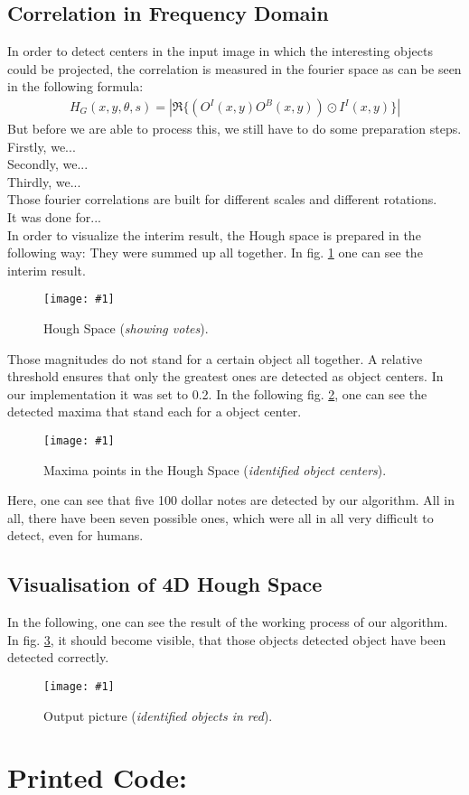 \documentclass[a4paper,headings=small]{scrartcl}
\numberwithin{equation}{section} %
\numberwithin{figure}{section}   %
\newcommand{\image}[3]{
	\begin{figure}[htbp]
		\centering
		\texttt{[image: \#1]}
		\caption{#3}
		\label{fig:#1}
	\end{figure}
}
\newcommand{\generatedImgRoot}{../../../target}
\newcommand{\targetFlag}{test_} %
\newcommand{\objThresh}{0.2} %
\begin{document}
\subsection{Correlation in Frequency Domain}
In order to detect centers in the input image in which the interesting objects could be projected,
the correlation is measured in the fourier space as can be seen in the following formula:
\begin{align}
H_G(x,y,\theta,s) = |\Re\{(O^I(x,y)O^B(x,y))\odot I^I(x,y)\}|
\end{align}
But before we are able to process this, we still have to do some preparation steps.\\
Firstly, we...\\
Secondly, we...\\
Thirdly, we...\\
Those fourier correlations are built for different scales and different rotations.\\
It was done for...\\
In order to visualize the interim result, the Hough space is prepared in the following way:
They were summed up all together.
In fig. \ref{fig:\generatedImgRoot/\targetFlag8_Hough.png} one can see the interim result.

\image{\generatedImgRoot/\targetFlag8_Hough.png}{0.4}{%
		Hough Space (\emph{showing votes}).}

Those magnitudes do not stand for a certain object all together. 
A relative threshold ensures that only the greatest ones are detected as object centers.
In our implementation it was set to \objThresh.
In the following fig. \ref{fig:\generatedImgRoot/\targetFlag9_maxHough.png},
one can see the detected maxima that stand each for a object center.

\image{\generatedImgRoot/\targetFlag9_maxHough.png}{0.4}{%
		Maxima points in the Hough Space (\emph{identified object centers}).}

Here, one can see that five 100 dollar notes are detected by our algorithm.
All in all, there have been seven possible ones, which were all in all very difficult
to detect, even for humans.

\subsection{Visualisation of 4D Hough Space}

In the following, one can see the result of the working process of our algorithm.
In fig. \ref{fig:\generatedImgRoot/\targetFlag10_result.png}, 
it should become visible, that those objects detected object have been detected correctly.

\image{\generatedImgRoot/\targetFlag10_result.png}{0.4}{%
		Output picture (\emph{identified objects in red}).}

\newpage
\section{Printed Code:}


\end{document}
